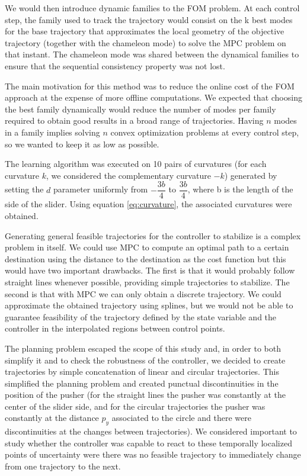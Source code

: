 \documentclass[12,twoside]{TFG-GM}
\theoremstyle{definition}
\theoremstyle{remark}
\begin{document}
We would then introduce dynamic families to the FOM problem. At each control step, the family used to track the trajectory would consist on the k best modes for the base trajectory that approximates the local geometry of the objective trajectory (together with the chameleon mode) to solve the MPC problem on that instant. The chameleon mode was shared between the dynamical families to ensure that the sequential consistency property was not lost.

The main motivation for this method was to reduce the online cost of the FOM approach at the expense of more offline computations. We expected that choosing the best family dynamically would reduce the number of modes per family required to obtain good results in a broad range of trajectories. Having $n$ modes in a family implies solving $n$ convex optimization problems at every control step, so we wanted to keep it as low as possible.

The learning algorithm was executed on 10 pairs of curvatures (for each curvature $k$, we considered the complementary curvature $-k$) generated by setting the $d$ parameter uniformly from $-\dfrac{3b}{4}$ to  $\dfrac{3b}{4}$, where b is the length of the side of the slider. Using equation \ref{eq:curvature}, the associated curvatures were obtained.

Generating general feasible trajectories for the controller to stabilize is a complex problem in itself. We could use MPC to compute an optimal path to a certain destination using the distance to the destination as the cost function but this would have two important drawbacks. The first is that it would probably follow straight lines whenever possible, providing simple trajectories to stabilize. The second is that with MPC we can only obtain a discrete trajectory. We could approximate the obtained trajectory using splines, but we would not be able to guarantee feasibility of the trajectory defined by the state variable and the controller in the interpolated regions between control points.

The planning problem escaped the scope of this study and, in order to both simplify it and to check the robustness of the controller, we decided to create trajectories by simple concatenation of linear and circular trajectories. This simplified the planning problem and created punctual discontinuities in the position of the pusher (for the straight lines the pusher was constantly at the center of the slider side, and for the circular trajectories the pusher was constantly at the distance $p_y$ associated to the circle and there were discontinuities at the changes between trajectories). We considered important to study whether the controller was capable to react to these temporally localized points of uncertainty were there was no feasible trajectory to immediately change from one trajectory to the next.
\end{document}
